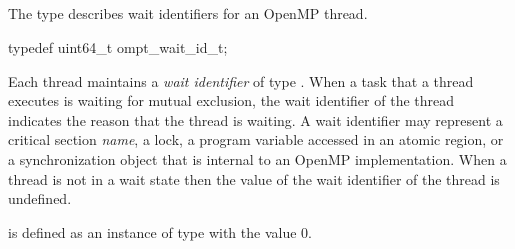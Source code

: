 \subsection{}
\label{sec:ompt_wait_id_t}

\summary
The  type describes wait identifiers for an OpenMP thread.

\format
\begin{ccppspecific}
\begin{omptOther}
typedef uint64_t ompt_wait_id_t;
\end{omptOther}
\end{ccppspecific}

\descr
Each thread maintains a \emph{wait identifier} of type . 
When a task that a thread executes is waiting for mutual exclusion, the wait 
identifier of the thread indicates the reason that the thread is waiting. A 
wait identifier may represent a critical section {\em name}, a lock, a program 
variable accessed in an atomic region, or a synchronization object that is 
internal to an OpenMP implementation. When a thread is not in a wait state
then the value of the wait identifier of the thread is undefined.

 is defined as an instance of type 
 with the value 0.

